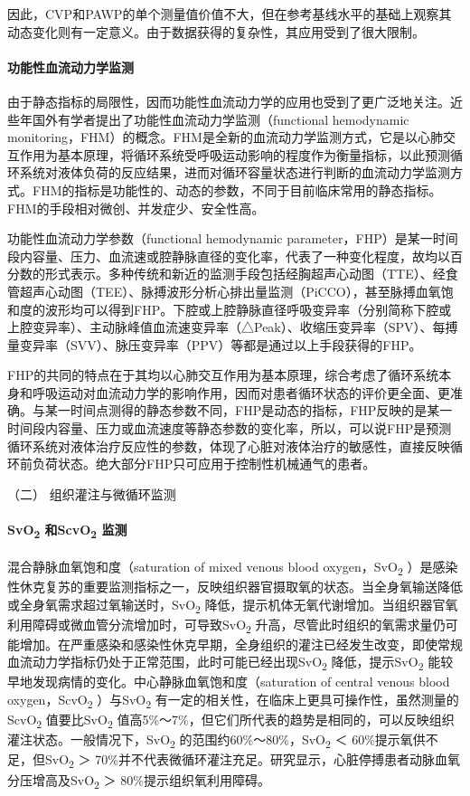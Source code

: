 因此，CVP和PAWP的单个测量值价值不大，但在参考基线水平的基础上观察其动态变化则有一定意义。由于数据获得的复杂性，其应用受到了很大限制。

\paragraph{功能性血流动力学监测}

由于静态指标的局限性，因而功能性血流动力学的应用也受到了更广泛地关注。近些年国外有学者提出了功能性血流动力学监测（functional
hemodynamic
monitoring，FHM）的概念。FHM是全新的血流动力学监测方式，它是以心肺交互作用为基本原理，将循环系统受呼吸运动影响的程度作为衡量指标，以此预测循环系统对液体负荷的反应结果，进而对循环容量状态进行判断的血流动力学监测方式。FHM的指标是功能性的、动态的参数，不同于目前临床常用的静态指标。FHM的手段相对微创、并发症少、安全性高。

功能性血流动力学参数（functional hemodynamic
parameter，FHP）是某一时间段内容量、压力、血流速或腔静脉直径的变化率，代表了一种变化程度，故均以百分数的形式表示。多种传统和新近的监测手段包括经胸超声心动图（TTE）、经食管超声心动图（TEE）、脉搏波形分析心排出量监测（PiCCO），甚至脉搏血氧饱和度的波形均可以得到FHP。下腔或上腔静脉直径呼吸变异率（分别简称下腔或上腔变异率）、主动脉峰值血流速变异率（△Peak）、收缩压变异率（SPV）、每搏量变异率（SVV）、脉压变异率（PPV）等都是通过以上手段获得的FHP。

FHP的共同的特点在于其均以心肺交互作用为基本原理，综合考虑了循环系统本身和呼吸运动对血流动力学的影响作用，因而对患者循环状态的评价更全面、更准确。与某一时间点测得的静态参数不同，FHP是动态的指标，FHP反映的是某一时间段内容量、压力或血流速度等静态参数的变化率，所以，可以说FHP是预测循环系统对液体治疗反应性的参数，体现了心脏对液体治疗的敏感性，直接反映循环前负荷状态。绝大部分FHP只可应用于控制性机械通气的患者。

\hypertarget{text00055.htmlux5cux23CHP2-1-2-4-2}{}
（二） 组织灌注与微循环监测

\paragraph{SvO\textsubscript{2} 和ScvO\textsubscript{2} 监测}

混合静脉血氧饱和度（saturation of mixed venous blood
oxygen，SvO\textsubscript{2}
）是感染性休克复苏的重要监测指标之一，反映组织器官摄取氧的状态。当全身氧输送降低或全身氧需求超过氧输送时，SvO\textsubscript{2}
降低，提示机体无氧代谢增加。当组织器官氧利用障碍或微血管分流增加时，可导致SvO\textsubscript{2}
升高，尽管此时组织的氧需求量仍可能增加。在严重感染和感染性休克早期，全身组织的灌注已经发生改变，即使常规血流动力学指标仍处于正常范围，此时可能已经出现SvO\textsubscript{2}
降低，提示SvO\textsubscript{2}
能较早地发现病情的变化。中心静脉血氧饱和度（saturation of central venous
blood oxygen，ScvO\textsubscript{2} ）与SvO\textsubscript{2}
有一定的相关性，在临床上更具可操作性，虽然测量的ScvO\textsubscript{2}
值要比SvO\textsubscript{2}
值高5\%～7\%，但它们所代表的趋势是相同的，可以反映组织灌注状态。一般情况下，SvO\textsubscript{2}
的范围约60\%～80\%，SvO\textsubscript{2} ＜
60\%提示氧供不足，但SvO\textsubscript{2} ＞
70\%并不代表微循环灌注充足。研究显示，心脏停搏患者动脉血氧分压增高及SvO\textsubscript{2}
＞ 80\%提示组织氧利用障碍。

